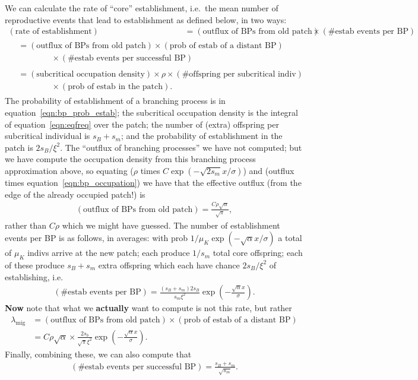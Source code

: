 \documentclass{article}
\newcommand{\migrate}{\lambda_\text{mig}}
\begin{document}
We can calculate the rate of ``core'' establishment, i.e.\ the mean number of reproductive events that lead to establishment as defined below, in two ways:
\begin{align}
  (\mbox{rate of establishment}) &= (\mbox{outflux of BPs from old patch}) \times (\mbox{\# estab events per BP}) \\
    \begin{split} &= (\mbox{outflux of BPs from old patch}) \times (\mbox{prob of estab of a distant BP}) \\
  & \qquad \qquad \times (\mbox{\# estab events per successful BP}) \end{split} \\
  \begin{split} &= (\mbox{subcritical occupation density}) \times \rho \times (\mbox{\# offspring per subcritical indiv}) \\
    & \qquad \qquad \times (\mbox{prob of estab in the patch}) . \end{split} 
\end{align}
The probability of establishment of a branching process is in equation~\eqref{eqn:bp_prob_estab};
the subcritical occupation density is the integral of equation~\eqref{eqn:eqfreq} over the patch;
the number of (extra) offspring per subcritical individual is $s_B+s_m$;
and the probability of establishment in the patch is $2s_B/\xi^2$.
The ``outflux of branching processes'' we have not computed;
but we have compute the occupation density from this branching process approximation above,
so equating ($\rho$ times $C\exp(-\sqrt{2 s_m}x/\sigma)$) and (outflux times equation~\eqref{eqn:bp_occupation})
we have that the effective outflux (from the edge of the already occupied patch!) is 
\begin{align}
  (\mbox{outflux of BPs from old patch}) = \frac{ C \rho \sqrt{\alpha} }{ \sqrt{\pi} } ,
\end{align}
rather than $C\rho$ which we might have guessed.
The number of establishment events per BP is as follows, in averages: 
with prob $1/\mu_K \exp(-\sqrt{\alpha} x/ \sigma)$ a total of $\mu_K$ indivs arrive at the new patch; 
each produce $1/s_m$ total core offspring;
each of these produce $s_B+s_m$ extra offspring which each have chance $2s_B/\xi^2$ of establishing,
i.e.
\begin{align}
  (\mbox{\# estab events per BP}) = \frac{(s_B+s_m) 2 s_B }{ s_m \xi^2 } \exp\left(-\frac{\sqrt{\alpha} x}{\sigma}\right) .
\end{align}
\textbf{Now} note that what we \textbf{actually} want to compute is not this rate, but rather 
\begin{align}
  \migrate &= (\mbox{outflux of BPs from old patch}) \times (\mbox{prob of estab of a distant BP}) \\
  &= C \rho \sqrt{\alpha} \times \frac{2 s_b}{\sqrt{\pi} \xi^2} \exp\left(- \frac{\sqrt{\alpha}x}{\sigma} \right) .
\end{align}
Finally, combining these, we can also compute that
\begin{align}
  (\mbox{\# estab events per successful BP}) = \frac{s_B+s_m}{ \sqrt{s_m} } .
\end{align}
\end{document}
